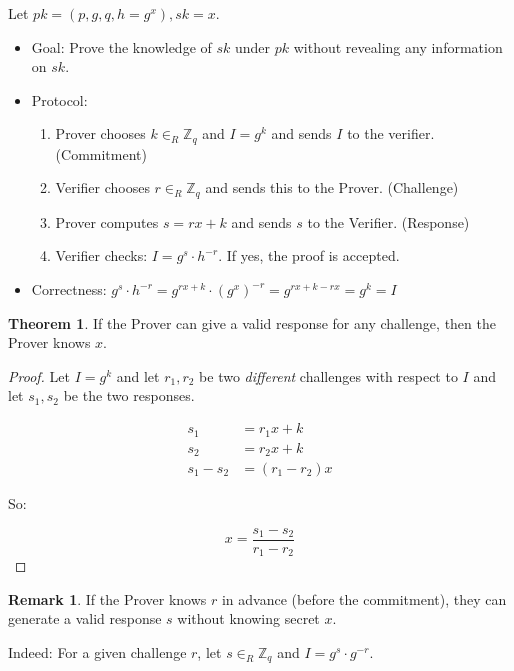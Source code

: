 \documentclass[11pt]{article}
\theoremstyle{definition}
\newtheorem{theorem}{Theorem}[section]
\newtheorem{remark}{Remark}[section]
\theoremstyle{proof}
\begin{document}
Let $pk = (p, g, q, h=g^x), sk = x$.

\begin{itemize}
	\item Goal: Prove the knowledge of $sk$ under $pk$ without revealing any information on $sk$.
	\item Protocol:
	\begin{enumerate}
		\item Prover chooses $k \in_R \mathbb{Z}_q$ and $I=g^k$ and sends $I$ to the verifier. (Commitment)
		\item Verifier chooses $r \in_R \mathbb{Z}_q$ and sends this to the Prover. (Challenge)
		\item Prover computes $s=rx + k$ and sends $s$ to the  Verifier. (Response)
		\item Verifier checks: $I = g^s \cdot h^{-r}$. If yes, the proof is accepted.
	\end{enumerate}
	\item Correctness: $g^s \cdot h^{-r} = g^{rx + k} \cdot (g^x)^{-r} = g^{rx + k - rx} = g^k = I$
	
\end{itemize}

\begin{theorem}
	If the Prover can give a valid response for any challenge, then the Prover knows $x$.
\end{theorem}

\begin{proof}
	Let $I = g^k$ and let $r_1, r_2$ be two \emph{different} challenges with respect to $I$ and let $s_1, s_2$ be the two responses.
	
	\begin{align}
		s_1 &= r_1x + k \\
		s_2 &= r_2x + k \\
		s_1 - s_2 &= (r_1 - r_2)x
	\end{align}
	
	So:
	
	$$
	x = \frac{s_1 - s_2}{r_1 - r_2}
	$$
	
\end{proof}

\begin{remark}
	If the Prover knows $r$ in advance (before the commitment), they can generate a valid response $s$ without knowing secret $x$.
	
	\noindent Indeed: For a given challenge $r$, let $s \in_R \mathbb{Z}_q$ and $I = g^s \cdot g^{-r}$.
\end{remark}
\end{document}
